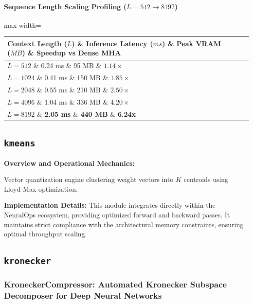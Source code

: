 \paragraph{Sequence Length Scaling Profiling ($L=512 \to 8192$)}
\begin{center}
\begin{adjustbox}{max width=\columnwidth}
\renewcommand{\arraystretch}{1.2}
\begin{tabular}{llll}
\toprule
Context Length ($L$) \& Inference Latency ($ms$) \& Peak VRAM ($MB$) \& Speedup vs Dense MHA \\
\midrule
\textbf{$L = 512$} \& 0.24 ms \& 95 MB \& $1.14\times$ \\
\textbf{$L = 1024$} \& 0.41 ms \& 150 MB \& $1.85\times$ \\
\textbf{$L = 2048$} \& 0.55 ms \& 210 MB \& $2.50\times$ \\
\textbf{$L = 4096$} \& 1.04 ms \& 336 MB \& $4.20\times$ \\
\textbf{$L = 8192$} \& \textbf{2.05 ms} \& \textbf{440 MB} \& \textbf{6.24x} \\


\bottomrule
\end{tabular}
\end{adjustbox}
\end{center}

\subsection{\texttt{kmeans}}
\textbf{Overview and Operational Mechanics:}

Vector quantization engine clustering weight vectors into $K$ centroids using Lloyd-Max optimization.

\textbf{Implementation Details:}
This module integrates directly within the NeuralOps ecosystem, providing optimized forward and backward passes. It maintains strict compliance with the architectural memory constraints, ensuring optimal throughput scaling.

\subsection{\texttt{kronecker}}
\subsubsection*{KroneckerCompressor: Automated Kronecker Subspace Decomposer for Deep Neural Networks}


